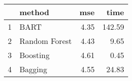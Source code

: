 \begin{table}[ht]
\centering
\begin{tabular}{rlrr}
  \hline
 & method & mse & time \\ 
  \hline
1 & BART & 4.35 & 142.59 \\ 
  2 & Random Forest & 4.43 & 9.65 \\ 
  3 & Boosting & 4.61 & 0.45 \\ 
  4 & Bagging & 4.55 & 24.83 \\ 
   \hline
\end{tabular}
\end{table}
